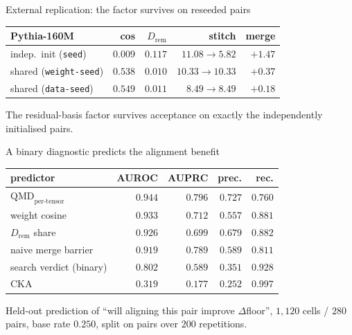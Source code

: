 \documentclass{beamer}
\newcommand{\Drem}{D_{\mathrm{rem}}}
\begin{document}
\begin{frame}{External replication: the factor survives on reseeded pairs}
  \centering
  \small
  \small
\begin{tabular}{lrrrr}
\toprule
Pythia-160M & cos & $\Drem$ & stitch & merge \\
\midrule
indep.\ init (\texttt{seed})   & $0.009$ & $\mathbf{0.117}$ & $11.08{\to}5.82$ & $\mathbf{+1.47}$ \\
shared (\texttt{weight-seed})  & $0.538$ & $0.010$ & $10.33{\to}10.33$ & $+0.37$ \\
shared (\texttt{data-seed})    & $0.549$ & $0.011$ & $8.49{\to}8.49$ & $+0.18$ \\
\bottomrule
\end{tabular}
  \vspace{0.8em}
  \begin{minipage}{0.92\textwidth}\footnotesize The residual-basis factor survives acceptance on exactly the independently initialised pairs.\end{minipage}
\end{frame}

\begin{frame}{A binary diagnostic predicts the alignment benefit}
  \centering
  \small
  \small
\begin{tabular}{lrrrr}
\toprule
predictor & AUROC & AUPRC & prec. & rec. \\
\midrule
$\mathrm{QMD}_{\text{per-tensor}}$ & $\mathbf{0.944}$ & $\mathbf{0.796}$ & $0.727$ & $0.760$ \\
weight cosine                      & $0.933$ & $0.712$ & $0.557$ & $0.881$ \\
$\Drem$ share                      & $0.926$ & $0.699$ & $0.679$ & $0.882$ \\
naive merge barrier                & $0.919$ & $0.789$ & $0.589$ & $0.811$ \\
search verdict (binary)            & $0.802$ & $0.589$ & $0.351$ & $0.928$ \\
CKA                                & $0.319$ & $0.177$ & $0.252$ & $0.997$ \\
\bottomrule
\end{tabular}
  \vspace{0.8em}
  \begin{minipage}{0.92\textwidth}\footnotesize Held-out prediction of ``will aligning this pair improve $\Delta$floor'', $1{,}120$ cells /
$280$ pairs, base rate $0.250$, split on pairs over $200$ repetitions.\end{minipage}
\end{frame}
\end{document}
